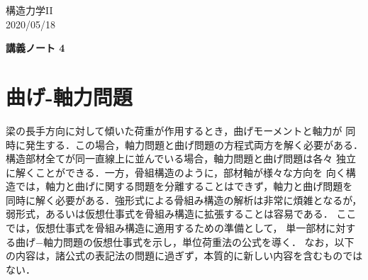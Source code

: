 ﻿\documentclass[10pt,a4j]{jarticle}
\newlength{\minitwocolumn}
\begin{document}
\newcommand{\fat}[1]{\mbox{\boldmath $#1$}}
\newcommand{\D}{\partial}
\newcommand{\w}{\omega}
\newcommand{\ga}{\alpha}
\newcommand{\gb}{\beta}
\newcommand{\gx}{\xi}
\newcommand{\gz}{\zeta}
\newcommand{\vhat}[1]{\hat{\fat{#1}}}
\newcommand{\spc}{\vspace{0.7\baselineskip}}
\newcommand{\halfspc}{\vspace{0.3\baselineskip}}

\newcommand{\twofig}[2]
 {
   \begin{figure}
     \begin{minipage}[t]{\minitwocolumn}
         \begin{center}   #1
         \end{center}
     \end{minipage}
         \hspace{\columnsep}
     \begin{minipage}[t]{\minitwocolumn}
         \begin{center} #2
         \end{center}
     \end{minipage}
   \end{figure}
 }
\begin{flushright}
	構造力学II\\
	2020/05/18
\end{flushright}
\begin{center}
	{\LARGE \bf 講義ノート 4} \\
\end{center}
\setcounter{section}{3}
\section{曲げ-軸力問題}
梁の長手方向に対して傾いた荷重が作用するとき，曲げモーメントと軸力が
同時に発生する．この場合，軸力問題と曲げ問題の方程式両方を解く必要がある．
構造部材全てが同一直線上に並んでいる場合，軸力問題と曲げ問題は各々
独立に解くことができる．一方，骨組構造のように，部材軸が様々な方向を
向く構造では，軸力と曲げに関する問題を分離することはできず，軸力と曲げ問題を
同時に解く必要がある．強形式による骨組み構造の解析は非常に煩雑となるが，
弱形式，あるいは仮想仕事式を骨組み構造に拡張することは容易である．
ここでは，仮想仕事式を骨組み構造に適用するための準備として，
単一部材に対する曲げ−軸力問題の仮想仕事式を示し，単位荷重法の公式を導く．
なお，以下の内容は，諸公式の表記法の問題に過ぎず，本質的に新しい内容を含むものではない．
\end{document}
